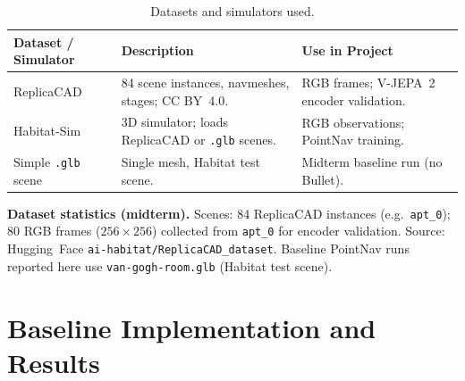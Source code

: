 \documentclass{article}
\begin{document}

\begin{table}[htbp]
\centering
\caption{Datasets and simulators used.}
\label{tab:dataset}
\begin{tabular}{p{2.8cm} p{6cm} p{4cm}}
\toprule
\textbf{Dataset / Simulator} & \textbf{Description} & \textbf{Use in Project} \\
\midrule
ReplicaCAD
    & 84 scene instances, navmeshes, stages; CC BY~4.0.
    & RGB frames; V-JEPA~2 encoder validation. \\[4pt]
Habitat-Sim
    & 3D simulator; loads ReplicaCAD or \texttt{.glb} scenes.
    & RGB observations; PointNav training. \\[4pt]
Simple \texttt{.glb} scene
    & Single mesh, Habitat test scene.
    & Midterm baseline run (no Bullet). \\
\bottomrule
\end{tabular}
\end{table}

\noindent\textbf{Dataset statistics (midterm).}
Scenes: 84 ReplicaCAD instances (e.g.\ \texttt{apt\_0}); 80 RGB frames
($256\times256$) collected from \texttt{apt\_0} for encoder validation. Source:
Hugging~Face \texttt{ai-habitat/ReplicaCAD\_dataset}. Baseline PointNav runs reported
here use \texttt{van-gogh-room.glb} (Habitat test scene).

\section{Baseline Implementation and Results}
\end{document}
